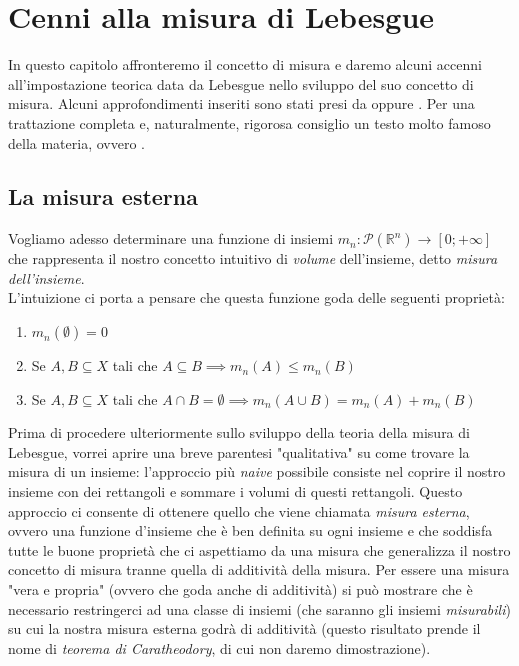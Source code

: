 \chapter{Cenni alla misura di Lebesgue}
\pagestyle{plain}
\thispagestyle{empty}
\pagestyle{fancy}
In questo capitolo affronteremo il concetto di misura e daremo alcuni accenni all'impostazione teorica data da Lebesgue nello sviluppo
del suo concetto di misura. Alcuni approfondimenti inseriti sono stati presi da \cite{rudin} oppure \cite{tao}. Per una trattazione completa e, naturalmente, rigorosa consiglio un testo molto famoso della materia, ovvero \cite{measure_theory}.

\section{La misura esterna}
Vogliamo adesso determinare una funzione di insiemi $m_n: \mathcal{P}(\mathbb{R}^n) \to [0; +\infty]$ che rappresenta il nostro concetto intuitivo di \emph{volume} dell'insieme, detto \emph{misura dell'insieme}. \\
L'intuizione ci porta a pensare che questa funzione goda delle seguenti proprietà:
\begin{enumerate}[label=\protect\circled{\arabic*}]
	\item $m_n(\emptyset) = 0$
	\item Se $A, B \subseteq X$ tali che $A \subseteq B \implies m_n(A) \leq m_n(B)$
	\item Se $A, B \subseteq X$ tali che $A \cap B = \emptyset \implies m_n(A \cup B) = m_n(A) + m_n(B)$
\end{enumerate}
Prima di procedere ulteriormente sullo sviluppo della teoria della misura di Lebesgue, vorrei aprire una breve parentesi "qualitativa" su come trovare la misura di un insieme: l'approccio più \emph{naive} possibile consiste nel coprire il nostro insieme con dei rettangoli e sommare i volumi di questi rettangoli. Questo approccio ci consente di ottenere quello che viene chiamata \emph{misura esterna}, ovvero una funzione d'insieme che è ben definita su ogni insieme e che soddisfa tutte le buone
proprietà che ci aspettiamo da una misura che generalizza il nostro concetto di misura tranne quella di additività della misura. Per essere una misura "vera e propria" (ovvero che goda anche di additività) si può mostrare che è necessario restringerci
ad una classe di insiemi (che saranno gli insiemi \emph{misurabili}) su cui la nostra misura esterna godrà di additività (questo risultato prende il nome di \emph{teorema di Caratheodory}, di cui non daremo dimostrazione).
